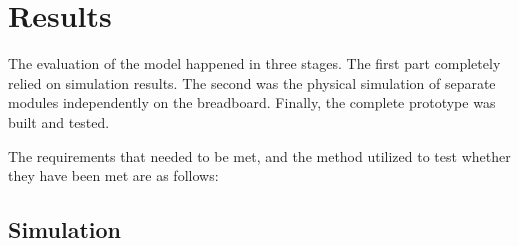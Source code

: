 \section{Results}
The evaluation of the model happened in three stages. The first part completely relied on simulation results. The second was the physical simulation of separate modules independently on the breadboard. Finally, the complete prototype was built and tested.
\par
The requirements that needed to be met, and the method utilized to test whether they have been met are as follows:

\begin{figure}[h]
\end{figure}
\subsection{Simulation}
